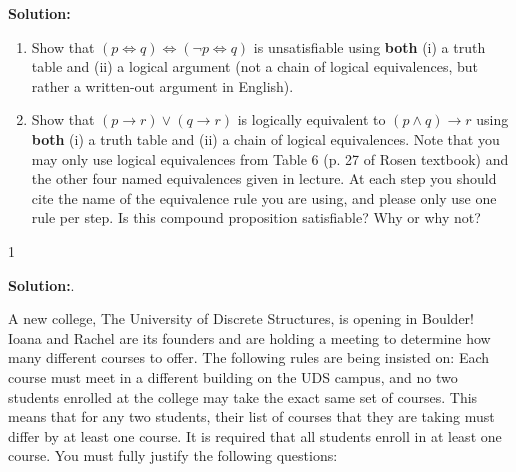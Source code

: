 \documentclass[9pt]{article}
\def\solutions{1}
\newcommand{\ben}{\begin{enumerate}}
\newcommand{\een}{\end{enumerate}}
\begin{document}
\textbf{Solution:} \\ %


\fi

\vspace{5mm}


\item 

\ben
\item Show that $(p \Leftrightarrow q) \Leftrightarrow (\neg p \Leftrightarrow q)$ is unsatisfiable using \textbf{both} (i) a truth table and (ii) a logical argument (not a chain of logical equivalences, but rather a written-out argument in English).

\vspace{2mm}

\item Show that $ (p \to r) \vee (q \to r) $ is logically equivalent to $(p \wedge q) \to r $ using \textbf{both} (i) a truth table and (ii) a chain of logical equivalences. Note that you may only use logical equivalences from Table 6 (p. 27 of Rosen textbook) and the other four named equivalences given in lecture. At each step you should cite the name of the equivalence rule you are using, and please only use one rule per step. Is this compound proposition satisfiable? Why or why not?
\een


\if\solutions1
\vspace{2mm}

\textbf{Solution:}.  %

  
\fi

\vspace{5mm}

\vspace{5mm}


\item A new college, The University of Discrete Structures, is opening in Boulder! Ioana and Rachel are its founders and are holding a meeting to determine how many different courses to offer. The following rules are being insisted on: Each course must meet in a different building on the UDS campus, and no two students enrolled at the college may take the exact same set of courses.  This means that for any two students, their list of courses that they are taking must differ by at least one course. It is required that all students enroll in at least one course. You must fully justify the following questions:
\end{document}
